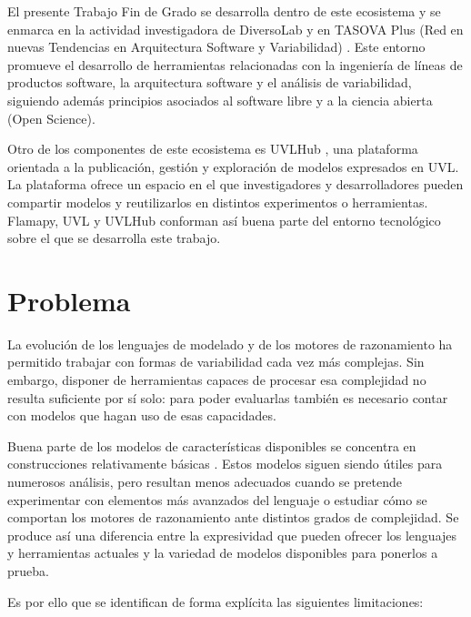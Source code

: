 El presente Trabajo Fin de Grado se desarrolla dentro de este ecosistema y se enmarca en la actividad investigadora de DiversoLab y en TASOVA Plus (Red en nuevas Tendencias en Arquitectura Software y Variabilidad) \cite{tasovaplus}. Este entorno promueve el desarrollo de herramientas relacionadas con la ingeniería de líneas de productos software, la arquitectura software y el análisis de variabilidad, siguiendo además principios asociados al software libre y a la ciencia abierta (Open Science).

Otro de los componentes de este ecosistema es UVLHub \cite{uvlhub2024}, una plataforma orientada a la publicación, gestión y exploración de modelos expresados en UVL. La plataforma ofrece un espacio en el que investigadores y desarrolladores pueden compartir modelos y reutilizarlos en distintos experimentos o herramientas. Flamapy, UVL y UVLHub conforman así buena parte del entorno tecnológico sobre el que se desarrolla este trabajo.

\section{Problema}
\label{sec:problema}



La evolución de los lenguajes de modelado y de los motores de razonamiento ha permitido trabajar con formas de variabilidad cada vez más complejas. Sin embargo, disponer de herramientas capaces de procesar esa complejidad no resulta suficiente por sí solo: para poder evaluarlas también es necesario contar con modelos que hagan uso de esas capacidades.

Buena parte de los modelos de características disponibles se concentra en construcciones relativamente básicas \cite{sundermann2024generating}. Estos modelos siguen siendo útiles para numerosos análisis, pero resultan menos adecuados cuando se pretende experimentar con elementos más avanzados del lenguaje o estudiar cómo se comportan los motores de razonamiento ante distintos grados de complejidad. Se produce así una diferencia entre la expresividad que pueden ofrecer los lenguajes y herramientas actuales y la variedad de modelos disponibles para ponerlos a prueba.

Es por ello que se identifican de forma explícita las siguientes limitaciones:

